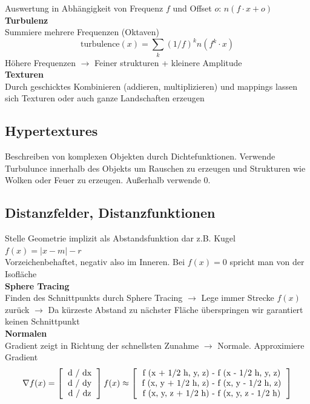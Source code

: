 \documentclass[10pt,a4paper]{article}
\begin{document}
        Auswertung in Abhängigkeit von Frequenz \(f\) und Offset \(o\): \(n(f \cdot x + o)\)\\

        \textbf{Turbulenz}\\
        Summiere mehrere Frequenzen (Oktaven)\\
        \[\text{turbulence}(x) = \sum_k (1 / f)^k n(f^k \cdot x)\]
        Höhere Frequenzen \(\rightarrow\) Feiner strukturen + kleinere Amplitude\\

        \textbf{Texturen}\\
        Durch geschicktes Kombinieren (addieren, multiplizieren) und mappings lassen sich Texturen oder auch
        ganze Landschaften erzeugen
        
        \subsection{Hypertextures}
        Beschreiben von komplexen Objekten durch Dichtefunktionen. Verwende Turbulunce innerhalb des Objekts
        um Rauschen zu erzeugen und Strukturen wie Wolken oder Feuer zu erzeugen. Außerhalb verwende 0.
        
        \subsection{Distanzfelder, Distanzfunktionen}
        Stelle Geometrie implizit als Abstandsfunktion dar z.B. Kugel \(f(x) = | x - m | - r\)\\
        Vorzeichenbehaftet, negativ also im Inneren. Bei \(f(x) = 0\) spricht man von der Isofläche\\

        \textbf{Sphere Tracing}\\
        Finden des Schnittpunkts durch Sphere Tracing \(\rightarrow\) Lege immer Strecke \(f(x)\) zurück
        \(\rightarrow\) Da kürzeste Abstand zu nächster Fläche überspringen wir garantiert keinen Schnittpunkt\\

        \textbf{Normalen}\\
        Gradient zeigt in Richtung der schnellsten Zunahme \(\rightarrow\) Normale. Approximiere Gradient
        \[\nabla f(x) = \left[
            \begin{tabular}{c}
              d / dx\\
              d / dy \\
              d / dz\\
              \end{tabular}
            \right] f(x)
            \approx
            \left[
              \begin{tabular}{c}
                f (x + 1/2 h, y, z) - f (x - 1/2 h, y, z)\\
                f (x, y + 1/2 h, z) - f (x, y - 1/2 h, z)\\
                f (x, y, z + 1/2 h) - f (x, y, z - 1/2 h)\\
              \end{tabular}
            \right]
          \]
\end{document}
